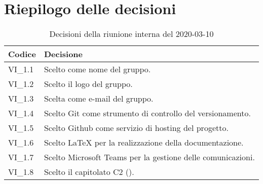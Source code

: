 \section{Riepilogo delle decisioni}
\begin{longtable}{ 
	 >{\centering}p{} >{}p{} }
	
	\caption{Decisioni della riunione interna del 2020-03-10}\\	
	
	\textbf{\color{white}Codice} & 
	\textbf{\color{white}Decisione} 
	\tabularnewline  
	\endhead
	
	VI\_1.1 & Scelto \Gruppo{} come nome del gruppo. \\
	VI\_1.2 & Scelto il logo del gruppo. \\
	VI\_1.3 & Scelta \Mail{} come e-mail del gruppo. \\
	VI\_1.4 & Scelto Git come strumento di controllo del versionamento. \\
	VI\_1.5 & Scelto Github come servizio di hosting del progetto. \\
	VI\_1.6 & Scelto \LaTeX{} per la realizzazione della documentazione. \\ 
	VI\_1.7 & Scelto Microsoft Teams per la gestione delle comunicazioni. \\
	VI\_1.8 & Scelto il capitolato C2 (\NomeProgetto). \\
	
\end{longtable}